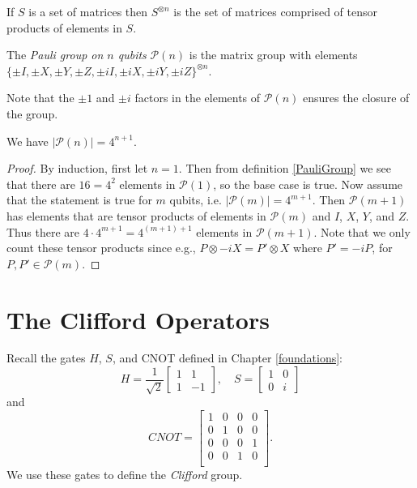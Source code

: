 \documentclass[12pt]{dalthesis}
\begin{document}
If $S$ is a set of matrices then $S^{\otimes n}$ is the set of matrices comprised of tensor products of elements in $S$.

\begin{definition}
\label{PauliGroup}
The \emph{Pauli group on $n$ qubits} $\mathcal{P}(n)$ is the matrix group with elements $\{ \pm I, \pm X, \pm Y, \pm Z, \pm iI, \pm iX, \pm iY, \pm iZ \}^{\otimes n}$.
\end{definition}

Note that the $\pm 1$ and $\pm i$ factors in the elements of $\mathcal{P}(n)$ ensures the closure of the group.


\begin{proposition}
\label{PauliCardinality}
We have $|\mathcal{P}(n)|=4^{n+1}$.
\end{proposition}

\begin{proof}
By induction, first let $n=1$. Then from definition \ref{PauliGroup} we see that there are $16 = 4^2$ elements in $\mathcal{P}(1)$, so the base case is true. Now assume that the statement is true for $m$ qubits, i.e. $|\mathcal{P}(m)| = 4^{m+1}$. Then $\mathcal{P}(m+1)$ has elements that are tensor products of elements in $\mathcal{P}(m)$ and $I$, $X$, $Y$, and $Z$. Thus there are $4 \cdot 4^{m+1} = 4^{(m+1)+1}$ elements in $\mathcal{P}(m+1)$. Note that we only count these tensor products since e.g., $P \otimes -iX = P' \otimes X$ where $P' = -iP$, for $P, P' \in \mathcal{P}(m)$.
\end{proof}

\section{The Clifford Operators}
Recall the gates $H$, $S$, and CNOT defined in Chapter \ref{foundations}:
  \[
  H = \frac{1}{\sqrt{2}} \begin{bmatrix}
  1 & 1 \\
  1 & -1
  \end{bmatrix}, \quad
  S = \begin{bmatrix}
  1 & 0 \\
  0 & i
  \end{bmatrix}
  \]
and 
  \[
  CNOT = \begin{bmatrix}
  1 & 0 & 0 & 0 \\
  0 & 1 & 0 & 0 \\
  0 & 0 & 0 & 1 \\
  0 & 0 & 1 & 0 \\
  \end{bmatrix}.
  \]
We use these gates to define the \emph{Clifford} group.
\end{document}
